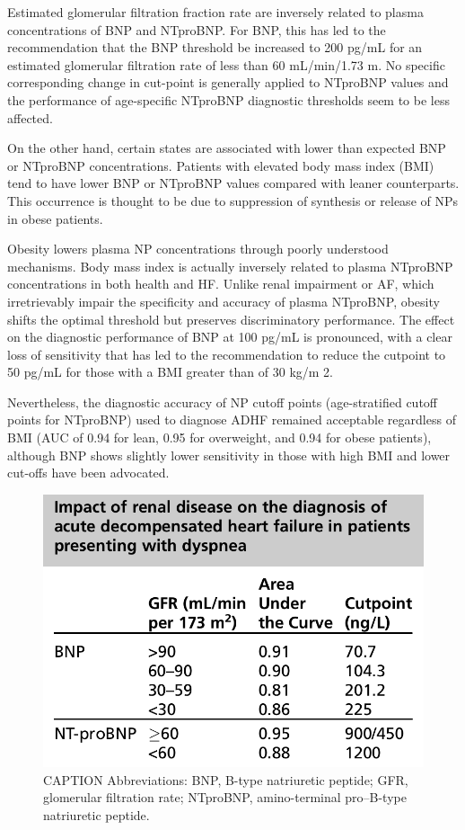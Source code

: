 \documentclass[14pt,a4paper,onecolumn]{extarticle}
\begin{document}
Estimated glomerular filtration fraction rate are inversely related to plasma concentrations of BNP and NTproBNP. For BNP, this has led to the recommendation that the BNP threshold be increased to 200 pg/mL for an estimated glomerular filtration rate of less than 60 mL/min/1.73 m. No specific corresponding change in cut-point is generally applied to NTproBNP values and the performance of age-specific NTproBNP diagnostic thresholds seem to be less affected. \citep{DeFilippi2008}

On the other hand, certain states are associated with lower than expected BNP or NTproBNP concentrations. Patients with elevated body mass index (BMI) tend to have lower BNP or NTproBNP values compared with leaner counterparts. This occurrence is thought to be due to suppression of synthesis or release of NPs in obese patients.\citep{Bayes-Genis2007}

Obesity lowers plasma NP concentrations through poorly understood mechanisms. Body mass index is actually inversely related to plasma NTproBNP concentrations in both health and HF. Unlike renal impairment or AF, which irretrievably impair the specificity and accuracy of plasma NTproBNP, obesity shifts the optimal threshold but preserves discriminatory performance. The effect on the diagnostic performance of BNP at 100 pg/mL is pronounced, with a clear loss of sensitivity that has led to the recommendation to reduce the cutpoint to 50 pg/mL for those with a BMI greater than of 30 kg/m 2. \citep{Daniels2006}

Nevertheless, the diagnostic accuracy of NP cutoff points (age-stratified cutoff points for NTproBNP) used to diagnose ADHF remained acceptable regardless of BMI (AUC of 0.94 for lean, 0.95 for overweight, and 0.94 for obese patients), although BNP shows slightly lower sensitivity in those with high BMI and lower cut-offs have been advocated. \citep{Bayes-Genis2007}

\begin{figure}   \includegraphics{../../images/NP_obesity.png}   \caption{CAPTION Abbreviations: BNP, B-type natriuretic peptide; GFR, glomerular filtration rate; NTproBNP, amino-terminal pro–B-type natriuretic peptide. \citep{DeFilippi2008}}   \label{NP_obesity} \end{figure}
\end{document}

